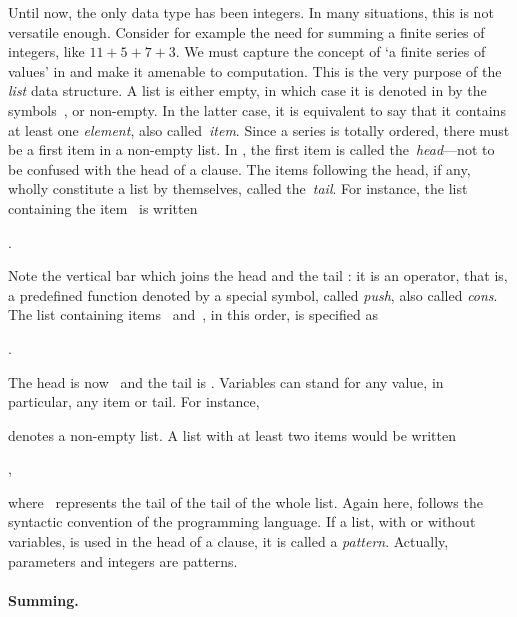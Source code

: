 Until now, the only data type has been integers. In many situations,
this is not versatile enough. Consider for example the need for
summing a finite series of integers, like \(11 + 5 + 7 + 3\). We must
capture the concept of `a finite series of values' in \Erlang and
make it amenable to computation. This is the very purpose of the
\emph{list} data structure. A list is either empty, in which case it
is denoted in \Erlang by the symbols~\erlcode{[]}, or
non\hyp{}empty. In the latter case, it is equivalent to say that it
contains at least one \emph{element}, also called~\emph{item}. Since a
series is totally ordered, there must be a first item in a
non\hyp{}empty list. In \Erlang, the first item is called
the~\emph{head}---not to be confused with the head of a clause. The
items following the head, if any, wholly constitute a list by
themselves, called the~\emph{tail}. For instance, the list containing
the item~ is written
\begin{center}
\erlcode{[1789 | []]}.
\end{center}
Note the vertical bar which joins the head  and the tail
\erlcode{[]}: it is an operator, that is, a predefined function
denoted by a special symbol, called \emph{push}, also called
\emph{cons}. The list containing items~
and~, in this order, is specified as
\begin{center}
.
\end{center}
The head is now~ and the tail is
\erlcode{[1789|[]]}. Variables can stand for any \Erlang value, in
particular, any item or tail. For instance,
\begin{center}
\end{center}
denotes a non\hyp{}empty list. A list with at least two items would be
written
\begin{center}
,
\end{center}
where~ represents the tail of the tail of the whole
list. Again here, \Erlang follows the syntactic convention of the
\Prolog programming language. If a list, with or without variables, is
used in the head of a clause, it is called a \emph{pattern}. Actually,
parameters and integers are patterns.

\medskip

\paragraph{Summing.}

